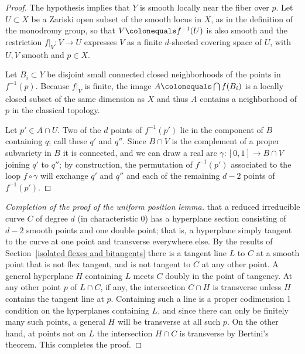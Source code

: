 \begin{proof} 
The hypothesis implies that $Y$ is smooth
locally near the fiber over $p$. Let $U \subset X$ be a Zariski open
subset of the smooth locus in $X$, as in the definition of the monodromy
group, so that  $V \colonequals  f^{-1}(U)$ is also smooth and the
restriction $f|_V : V \to U$ expresses $V$ as a finite $d$-sheeted
covering space of $U$, with $U,V$ smooth and $p\in X$.

Let $B_i\subset Y$ be disjoint small connected closed neighborhoods of
the points
in $f^{-1}(p)$. Because $f|_V$  is finite, the image $A \colonequals
\bigcap f(B_i)$  is a locally
closed subset of the same dimension as $X$ and thus $A$
 contains a neighborhood
of $p$ in the classical topology.

Let $p' \in A \cap U$. Two of the $d$ points of $f^{-1}(p')$  lie in the
component  of $B$ containing $q$; call these $q'$ and $q''$. Since $B
\cap V$ is the complement of a proper subvariety in $B$ it is connected,
and we can draw a real arc $\gamma : [0,1] \to B \cap V$ joining $q'$
to $q''$; by construction, the permutation of $f^{-1}(p')$ associated
to the loop $f \circ \gamma$ will exchange $q'$ and $q''$ and 
each
of the remaining $d-2$ points of $f^{-1}(p')$.
\end{proof}

\begin{proof}[Completion \kern1.5pt of \kern1.5pt the \kern1.5pt proof \kern1.5pt of \kern1.5pt the \kern1.5pt uniform \kern1.5pt position \kern1.5pt lemma]
%
that a reduced irreducible curve $C$ of degree $d$
 (in characteristic 0)
 has a hyperplane section consisting of $d-2$ smooth points and one
 double point; that is, a hyperplane simply tangent to the curve at one
 point and transverse everywhere else. By the results of
 Section~\ref{isolated flexes and bitangents} there is a tangent line $L$
 to $C$ at a smooth point that is not flex tangent, and is not tangent
 to $C$ at any other point. A general hyperplane $H$ containing $L$
 meets $C$ doubly in the point of
 tangency. At any other point $p$ of $L\cap C$, if any, the intersection
 $C\cap H$ is transverse
 unless $H$ contains the tangent line at $p$. Containing such a line is
 a  proper codimension 1 condition on
 the hyperplanes containing $L$, and since there can only be finitely
 many such points, a
 general  $H$ will be transverse at all such $p$. On the other hand,
 at points not on $L$
 the intersection $H\cap C$ is transverse by Bertini's theorem. This
 completes the proof.
\end{proof}

